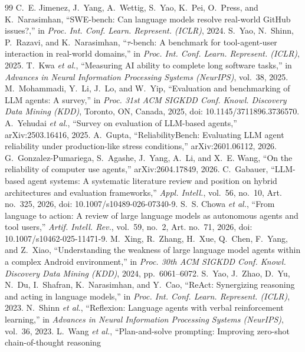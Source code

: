 \documentclass[10pt,a4paper,twocolumn]{article}
\begin{document}
\begin{thebibliography}{99}
\footnotesize
\setlength{\itemsep}{0pt}
 C.~E. Jimenez, J.~Yang, A.~Wettig, S.~Yao, K.~Pei, O.~Press, and K.~Narasimhan, ``SWE-bench: Can
language models resolve real-world GitHub issues?,'' in \emph{Proc. Int. Conf. Learn. Represent. (ICLR)}, 2024.
 S.~Yao, N.~Shinn, P.~Razavi, and K.~Narasimhan, ``$\tau$-bench: A benchmark for tool-agent-user
interaction in real-world domains,'' in \emph{Proc. Int. Conf. Learn. Represent. (ICLR)}, 2025.
 T.~Kwa \emph{et al.}, ``Measuring AI ability to complete long software tasks,'' in \emph{Advances in
Neural Information Processing Systems (NeurIPS)}, vol.~38, 2025.
 M.~Mohammadi, Y.~Li, J.~Lo, and W.~Yip, ``Evaluation and benchmarking of LLM agents: A survey,'' in
\emph{Proc. 31st ACM SIGKDD Conf. Knowl. Discovery Data Mining (KDD)}, Toronto, ON, Canada, 2025, doi:
10.1145/3711896.3736570.
 A.~Yehudai \emph{et al.}, ``Survey on evaluation of LLM-based agents,'' arXiv:2503.16416, 2025.
 A.~Gupta, ``ReliabilityBench: Evaluating LLM agent reliability under production-like stress
conditions,'' arXiv:2601.06112, 2026.
 G.~Gonzalez-Pumariega, S.~Agashe, J.~Yang, A.~Li, and X.~E. Wang, ``On the reliability of computer use
agents,'' arXiv:2604.17849, 2026.
 C.~Gabauer, ``LLM-based agent systems: A systematic literature review and position on hybrid
architectures and evaluation frameworks,'' \emph{Appl. Intell.}, vol.~56, no.~10, Art. no.~325, 2026, doi:
10.1007/s10489-026-07340-9.
 S.~S. Chowa \emph{et al.}, ``From language to action: A review of large language models as autonomous
agents and tool users,'' \emph{Artif. Intell. Rev.}, vol.~59, no.~2, Art. no.~71, 2026, doi: 10.1007/s10462-025-11471-9.
 M.~Xing, R.~Zhang, H.~Xue, Q.~Chen, F.~Yang, and Z.~Xiao, ``Understanding the weakness of large
language model agents within a complex Android environment,'' in \emph{Proc. 30th ACM SIGKDD Conf. Knowl. Discovery Data
Mining (KDD)}, 2024, pp.~6061--6072.
 S.~Yao, J.~Zhao, D.~Yu, N.~Du, I.~Shafran, K.~Narasimhan, and Y.~Cao, ``ReAct: Synergizing reasoning and
acting in language models,'' in \emph{Proc. Int. Conf. Learn. Represent. (ICLR)}, 2023.
 N.~Shinn \emph{et al.}, ``Reflexion: Language agents with verbal reinforcement learning,'' in
\emph{Advances in Neural Information Processing Systems (NeurIPS)}, vol.~36, 2023.
 L.~Wang \emph{et al.}, ``Plan-and-solve prompting: Improving zero-shot chain-of-thought reasoning

\end{thebibliography}
\end{document}
